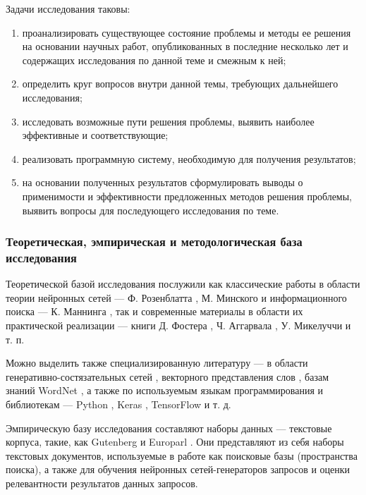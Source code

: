 Задачи исследования таковы:
\begin{enumerate}[1)]
      \item проанализировать существующее состояние проблемы и методы ее решения на основании научных работ, опубликованных
            в последние несколько лет и содержащих исследования по данной теме и смежным к ней;
      \item определить круг вопросов внутри данной темы, требующих дальнейшего исследования;
      \item исследовать возможные пути решения проблемы, выявить наиболее эффективные и соответствующие;
      \item реализовать программную систему, необходимую для получения результатов;
      \item на основании полученных результатов сформулировать выводы о применимости и эффективности предложенных
            методов решения проблемы, выявить вопросы для последующего исследования по теме.
\end{enumerate}

\subsubsection{Теоретическая, эмпирическая и методологическая база исследования}
Теоретической базой исследования послужили как классические работы в области теории нейронных сетей ---
Ф. Розенблатта \cite{rosenblatt1965}, М. Минского \cite{minsky1971} и информационного поиска ---
К. Маннинга \cite{manning2011wwedenie}, так и современные материалы в области
их практической реализации --- книги Д. Фостера \cite{foster2020generative}, Ч. Аггарвала \cite{aggarwal2020neural},
У. Микелуччи \cite{michelucci2020} и т. п.

Можно выделить также специализированную литературу --- в области генеративно-состязательных сетей 
\cite{ganguly2017learning,ahirwar2019generative,kalin2018generative,langr2019gans,brownlee2019generative},
векторного представления слов \cite{sogaard2019cross, hellrich2019word}, базам знаний WordNet 
\cite{fellbaum1998wordnet, gomez2005semantic}, а также по используемым языкам программирования и библиотекам ---
Python \cite{reitz2016hitchhiker, shaw2013learn, lutz2013learning}, Keras 
\cite{atienza2018advanced,ciaburro2018keras,gulli2017deep}, TensorFlow 
\cite{bharat2019tensorflow, scarpino2018tensorflow, singh2019learn} и т. д.

Эмпирическую базу исследования составляют наборы данных --- текстовые корпуса, такие, как Gutenberg \cite{lahiri:2014:SRW}
и Europarl \cite{Koehn2005EuroparlAP}. Они представляют из себя наборы текстовых документов, используемые в работе как
поисковые базы (пространства поиска), а также для обучения нейронных сетей-генераторов запросов и оценки релевантности 
результатов данных запросов. 

